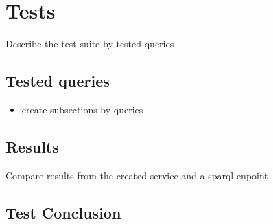 \chapter{Tests}
\label{chap:Tests}
Describe the test suite by tested queries
\section{Tested queries}
\begin{itemize}
\item create subsections by queries
\end{itemize}

\section{Results}
Compare results from the created service and a sparql enpoint

\section{Test Conclusion}


